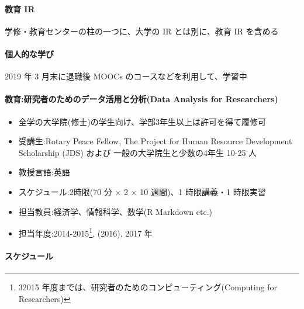 \documentclass[
]{bxjsbook}
\providecommand{\tightlist}{%
  \setlength{\itemsep}{0pt}\setlength{\parskip}{0pt}}
\theoremstyle{definition}
\theoremstyle{definition}
\theoremstyle{definition}
\theoremstyle{definition}
\theoremstyle{remark}
\begin{document}
\hypertarget{ux6559ux80b2-ir}{%
\paragraph{教育 IR}\label{ux6559ux80b2-ir}}

学修・教育センターの柱の一つに、大学の IR とは別に、教育 IR を含める

\hypertarget{ux500bux4ebaux7684ux306aux5b66ux3073}{%
\paragraph{個人的な学び}\label{ux500bux4ebaux7684ux306aux5b66ux3073}}

2019 年 3 月末に退職後 MOOCs のコースなどを利用して、学習中

\hypertarget{ux6559ux80b2ux7814ux7a76ux8005ux306eux305fux3081ux306eux30c7ux30fcux30bfux6d3bux7528ux3068ux5206ux6790data-analysis-for-researchers}{%
\paragraph{教育:研究者のためのデータ活用と分析(Data Analysis for Researchers)}\label{ux6559ux80b2ux7814ux7a76ux8005ux306eux305fux3081ux306eux30c7ux30fcux30bfux6d3bux7528ux3068ux5206ux6790data-analysis-for-researchers}}

\begin{itemize}
\tightlist
\item
  全学の大学院(修士)の学生向け、学部3年生以上は許可を得て履修可
\item
  受講生:Rotary Peace Fellow, The Project for Human Resource Development Scholarship (JDS) および 一般の大学院生と少数の4年生 10-25 人
\item
  教授言語:英語
\item
  スケジュール:2時限(70 分 × 2 × 10 週間)、1 時限講義・1 時限実習
\item
  担当教員:経済学、情報科学、数学(R Markdown etc.)
\item
  担当年度:2014-2015\footnote{32015 年度までは、研究者のためのコンピューティング(Computing for Researchers)}, (2016), 2017 年
\end{itemize}

\hypertarget{ux30b9ux30b1ux30b8ux30e5ux30fcux30eb}{%
\paragraph{スケジュール}\label{ux30b9ux30b1ux30b8ux30e5ux30fcux30eb}}
\end{document}
